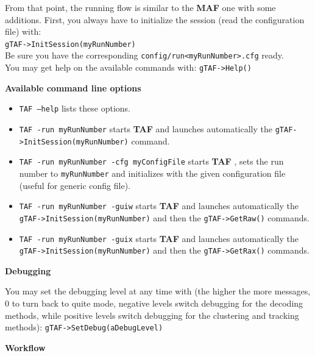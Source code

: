 \documentclass[a4paper, 12pt, twoside]{article}
\newcommand{\TAF}{{\bf TAF }}
\newcommand{\MAF}{{\bf MAF }}
\begin{document}
\noindent
From that point, the running flow is similar to the \MAF  one with some additions. First, you always have to initialize the session (read the configuration file) with:\\
{\tt gTAF->InitSession(myRunNumber)}\\

\noindent
Be sure you have the corresponding {\tt config/run<myRunNumber>.cfg} ready.\\

\noindent
You may get help on the available commands with:
{\tt gTAF->Help()}\\

\vspace{0.8 cm}

\noindent
{\bf Available command line options}

\noindent
\begin{itemize}
\item {\tt TAF --help} lists these options.
\item {\tt TAF -run myRunNumber} starts \TAF and launches automatically the {\tt gTAF->InitSession(myRunNumber)} command.
\item {\tt  TAF  -run myRunNumber -cfg myConfigFile} starts \TAF, sets the run number to {\tt myRunNumber} and initializes with the given configuration file (useful for generic config file).
\item {\tt TAF -run myRunNumber -guiw} starts \TAF and launches automatically the {\tt gTAF->InitSession(myRunNumber)} and then the {\tt gTAF->GetRaw()} commands.
\item {\tt TAF -run myRunNumber -guix} starts \TAF and launches automatically the {\tt gTAF->InitSession(myRunNumber)} and then the {\tt gTAF->GetRax()} commands.
\end{itemize}


\vspace{0.8 cm}

\noindent
{\bf Debugging}

\noindent
You may set the debugging level at any time with (the higher the more messages, 0 to turn back to quite mode, negative levels switch debugging for the decoding methods, while positive levels switch debugging for the clustering and tracking methods):
{\tt gTAF->SetDebug(aDebugLevel)}\\


\vspace{0.8 cm}

\noindent
{\bf Workflow}
\end{document}
